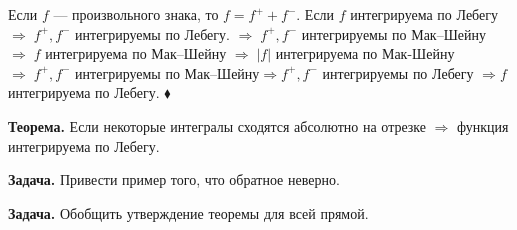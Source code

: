 Если $f$ --- произвольного знака, то $f = f^+ + f^-$. Если $f$
интегрируема по Лебегу $\Rightarrow \; f^+, f^-$ интегрируемы по
Лебегу. $\Rightarrow \; f^+, f^-$ интегрируемы по Мак--Шейну
$\Rightarrow \; f$ интегрируема по Мак--Шейну $\Rightarrow \; |f|$
интегрируема по Мак-Шейну $\Rightarrow \; f^+, f^-$ интегрируемы
по Мак--Шейну$\Rightarrow f^+, f^-$ интегрируемы по Лебегу
$\Rightarrow f$ интегрируема по Лебегу. $\blacklozenge$



\textbf{Теорема.} \quad Если некоторые интегралы сходятся
абсолютно на отрезке $\Rightarrow$ функция интегрируема по Лебегу.

\textbf{Задача.} \quad Привести пример того, что обратное неверно.

\textbf{Задача.} \quad Обобщить утверждение теоремы для всей
прямой.
